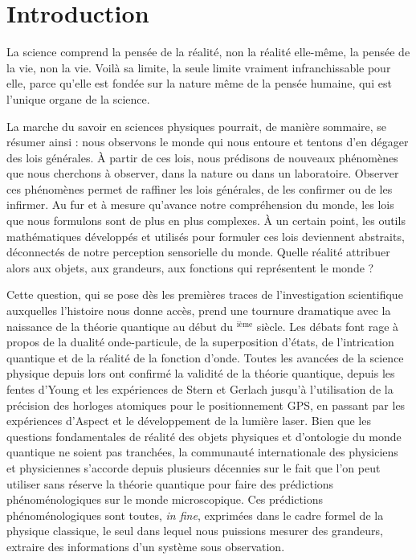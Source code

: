 \chapter*{Introduction}\label{chapter:intro}
 \mtcaddchapter
{}
\begin{fquote}
La science comprend la pensée de la réalité, non la réalité elle-même, la pensée de la vie, non la vie. Voilà sa limite, la seule limite vraiment infranchissable pour elle, parce qu'elle est fondée sur la nature même de la pensée humaine, qui est l'unique organe de la science.
\end{fquote}

La marche du savoir en sciences physiques pourrait, de manière sommaire, se résumer ainsi :
nous observons le monde qui nous entoure et tentons d'en dégager des lois générales.
À partir de ces lois, nous prédisons de nouveaux phénomènes que nous cherchons à observer, dans la nature ou dans un laboratoire.
Observer ces phénomènes permet de raffiner les lois générales, de les confirmer ou de les infirmer.
Au fur et à mesure qu'avance notre compréhension du monde, les lois que nous formulons sont de plus en plus complexes.
\`A un certain point, les outils mathématiques développés et utilisés pour formuler ces lois deviennent abstraits, déconnectés de notre perception sensorielle du monde.
Quelle \og réalité \fg{} attribuer alors aux objets, aux grandeurs, aux fonctions qui représentent le monde ?

\newcommand{\rom}[1]{\uppercase\expandafter{\romannumeral #1\relax}}
Cette question, qui se pose dès les premières traces de l'investigation scientifique auxquelles l'histoire nous donne accès, prend une tournure dramatique avec la naissance de la théorie quantique au début du \rom{20}$^{\text{ième}}$ siècle.
Les débats font rage à propos de la dualité onde-particule, de la superposition d'états, de l'intrication quantique et de la réalité de la fonction d'onde.
Toutes les avancées de la science physique depuis lors ont confirmé la validité de la théorie quantique, depuis les fentes d'Young et les expériences de Stern et Gerlach jusqu'à l'utilisation de la précision des horloges atomiques pour le positionnement GPS, en passant par les expériences d'Aspect et le développement de la lumière laser.
Bien que les questions fondamentales de réalité des objets physiques et d'ontologie du monde quantique ne soient pas tranchées, la communauté internationale des physiciens et physiciennes s'accorde depuis plusieurs décennies sur le fait que l'on peut utiliser sans réserve la théorie quantique pour faire des prédictions phénoménologiques sur le monde microscopique.
Ces prédictions phénoménologiques sont toutes, \textit{in fine}, exprimées dans le cadre formel de la physique classique, le seul dans lequel nous puissions mesurer des grandeurs, extraire des informations d'un système sous observation.

